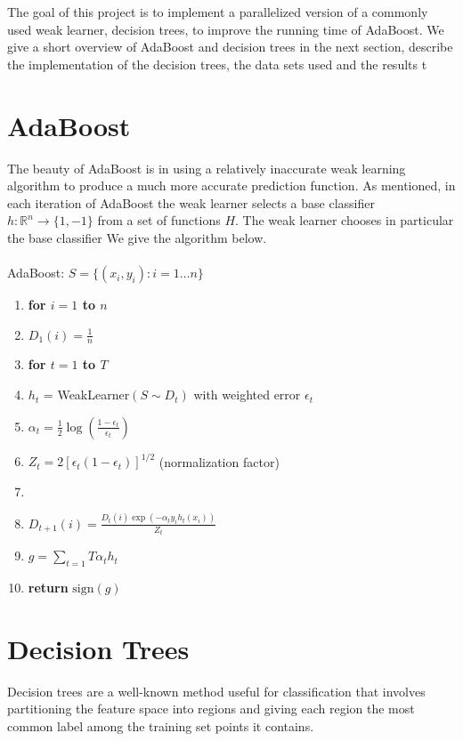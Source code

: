 \documentclass[12pt]{article}
\begin{document}
The goal of this project is to implement a parallelized version of a commonly used weak learner, decision trees, to improve the running time of AdaBoost. We give a short overview of AdaBoost and decision trees in the next section, describe the implementation of the decision trees, the data sets used and the results t 

\section{AdaBoost}
The beauty of AdaBoost is in using a relatively inaccurate weak learning algorithm to produce a much more accurate prediction function. As mentioned, in each iteration of AdaBoost the weak learner selects a base classifier $h: \mathbb{R}^n\rightarrow\{1,-1\}$ from a set of functions $H$. The weak learner chooses in particular the base classifier  We give the algorithm below.\\
\\
{\sc AdaBoost}: $S = \{(x_i,y_i):i = 1\ldots n\}$
\begin{enumerate}
\itemsep1pt \parskip0pt 
\item {\bf for $i=1$ to $n$}
\item \quad $D_1(i) = \frac{1}{n}$
\item {\bf for $t=1$ to $T$}
\item \quad $h_t$ = {\sc WeakLearner}$(S\sim D_t)$ with weighted error $\epsilon_t$
\item \quad $\alpha_t = \frac{1}{2}\log(\frac{1-\epsilon_t}{\epsilon_t})$
\item \quad $Z_t = 2[\epsilon_t(1-\epsilon_t)]^{1/2}$ (normalization factor)
\item {}
\item \quad \quad $D_{t+1}(i) = \frac{D_t(i)\exp(-\alpha_t y_i h_t(x_i))}{Z_t}$
\item $g = \sum_{t=1}{T} \alpha_t h_t$
\item {\bf return} $\mbox{sign}(g)$
\end{enumerate}



\section{Decision Trees}
Decision trees are a well-known method useful for classification that involves partitioning the feature space into regions and giving each region the most common label among the training set points it contains. 
\end{document}
